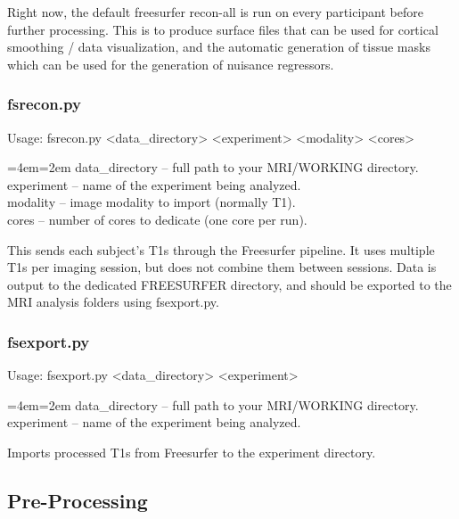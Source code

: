 \documentclass[final,titlepage,letterpaper,oneside,12pt]{article}
\renewcommand{\texttt}[2][BrickRed]{\textcolor{#1}{\ttfamily #2}}%
\newenvironment{blockquote}{%
  \par%
  \medskip
  \leftskip=4em\rightskip=2em%
  \noindent\ignorespaces}{%
  \par\medskip}
\begin{document}
Right now, the default freesurfer recon-all is run on every participant before further processing. This is to produce surface files that can be used for cortical smoothing / data visualization, and the automatic generation of tissue masks which can be used for the generation of nuisance regressors. 

\subsubsection{fsrecon.py}
Usage: \texttt{fsrecon.py <data\_directory> <experiment> <modality> <cores>} \

\begin{blockquote}
data\_directory -- full path to your MRI/WORKING directory. \\
experiment -- name of the experiment being analyzed. \\
modality -- image modality to import (normally T1). \\
cores -- number of cores to dedicate (one core per run). \
\end{blockquote}

\noindent This sends each subject's T1s through the Freesurfer pipeline. It uses multiple T1s per imaging session, but does not combine them between sessions. Data is output to the dedicated FREESURFER directory, and should be exported to the MRI analysis folders using \texttt{fsexport.py}.

\subsubsection{fsexport.py}
Usage: \texttt{fsexport.py <data\_directory> <experiment>}

\begin{blockquote}
data\_directory -- full path to your MRI/WORKING directory. \\
experiment -- name of the experiment being analyzed. \
\end{blockquote}

\noindent Imports processed T1s from Freesurfer to the experiment directory.

\subsection{Pre-Processing}
\end{document}
